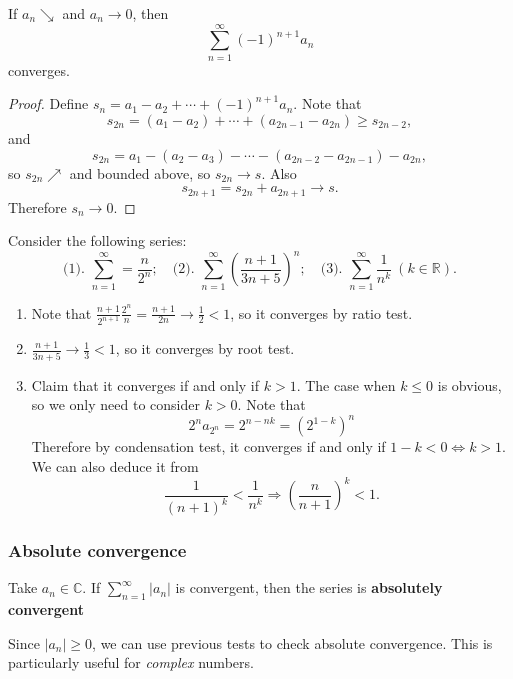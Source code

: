 \begin{theorem}\label{thm:Alternating series test}
    If $a_n\searrow$ and $a_n \to 0 $, then 
    \[
        \sum_{n=1}^{\infty}(-1)^{n+1}a_n
    \]
    converges.
\end{theorem}
\begin{proof}
    Define $ s_n = a_1-a_2+\cdots+(-1)^{n+1}a_n $. Note that 
    \[
        s_{2n} = (a_1-a_2)+\cdots+(a_{2n-1}-a_{2n})\ge s_{2n-2},
    \]
    and 
    \[
        s_{2n} = a_1 - (a_2-a_3)-\cdots-(a_{2n-2}-a_{2n-1}) - a_{2n},
    \]
    so $ s_{2n} \nearrow $ and bounded above, so $ s_{2n}\to s $. Also
    \[
        s_{2n+1}=s_{2n}+a_{2n+1}\to s.
    \]
    Therefore $ s_n\to 0 $.
\end{proof}

\begin{example}
    Consider the following series: 
    \[ 
        \text{(1). } \sum_{n=1}^{\infty} = \frac{n}{2^n};\quad \text{(2). } \sum_{n=1}^{\infty}\left( \frac{n+1}{3n+5} \right)^{n}; \quad \text{(3). } \sum_{n=1}^{\infty}\frac{1}{n^k}\ (k\in \mathbb{R}).
    \]

    \begin{enumerate}[(1).]
        \item Note that $ \frac{n+1}{2^{n+1}}\frac{2^n}{n}=\frac{n+1}{2n}\to \frac{1}{2}<1 $, so it converges by ratio test.
        \item $ \frac{n+1}{3n+5}\to \frac{1}{3}<1 $, so it converges by root test.
        \item Claim that it converges if and only if $k>1$. The case when $ k\le 0 $ is obvious, so we only need to consider $k>0$. Note that 
        \[
            2^na_{2^n} = 2^{n-nk}=(2^{1-k})^n
        \]
        Therefore by condensation test, it converges if and only if $ 1-k<0 \Leftrightarrow k>1 $. We can also deduce it from 
        \[
            \frac{1}{(n+1)^k}<\frac{1}{n^k} \Longrightarrow \left( \frac{n}{n+1} \right)^k<1.
        \]
    \end{enumerate}
\end{example}

\subsubsection{Absolute convergence}
\begin{definition}
    Take $ a_n\in \mathbb{C}  $. If $ \sum_{n=1}^{\infty}|a_n| $ is convergent, then the series is \textbf{absolutely convergent}
\end{definition}
\begin{note}
    Since $ |a_n|\ge 0 $, we can use previous tests to check absolute convergence. This is particularly useful for \textit{complex} numbers.
\end{note}

